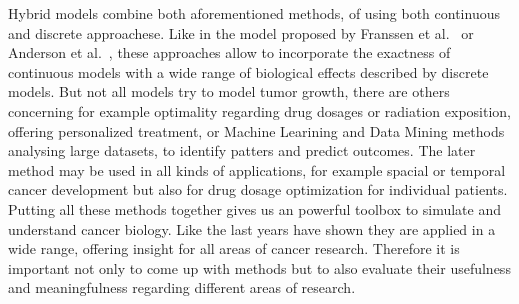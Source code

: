 Hybrid models combine both aforementioned methods, of using both continuous and discrete approachese. Like in the model proposed by Franssen et al.~\cite{franssen_mathematical_2019} or Anderson et al.~\cite{anderson_continuous_1998}, these approaches allow to incorporate the exactness of continuous models with a wide range of biological effects described by discrete models. \newline
But not all models try to model tumor growth, there are others concerning for example optimality regarding drug dosages or radiation exposition, offering personalized treatment, or Machine Learining and Data Mining methods analysing large datasets, to identify patters and predict outcomes. The later method may be used in all kinds of applications, for example spacial or temporal cancer development but also for drug dosage optimization for individual patients. Putting all these methods together gives us an powerful toolbox to simulate and understand cancer biology. Like the last years have shown they are applied in a wide range, offering insight for all areas of cancer research. Therefore it is important not only to come up with methods but to also evaluate their usefulness and meaningfulness regarding different areas of research.
